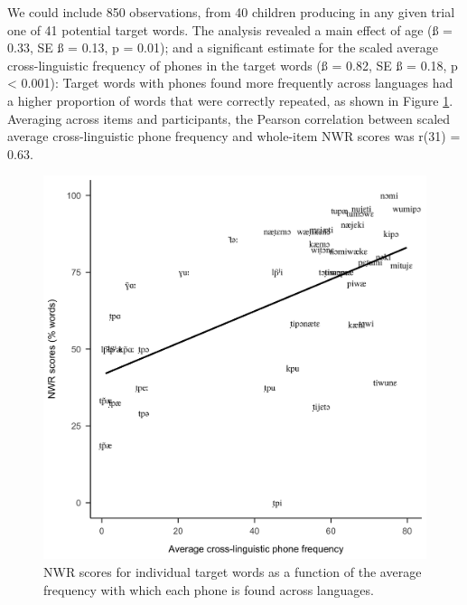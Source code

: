 \documentclass[english,,man,floatsintext]{apa6}
\begin{document}
We could include 850 observations, from 40 children producing in any
given trial one of 41 potential target words. The analysis revealed a
main effect of age (ß = 0.33, SE ß = 0.13, p = 0.01); and a significant
estimate for the scaled average cross-linguistic frequency of phones in
the target words (ß = 0.82, SE ß = 0.18, p \textless{} 0.001): Target
words with phones found more frequently across languages had a higher
proportion of words that were correctly repeated, as shown in Figure
\ref{fig:Fig2-xling-freq}. Averaging across items and participants, the
Pearson correlation between scaled average cross-linguistic phone
frequency and whole-item NWR scores was r(31) = 0.63.

\begin{figure}[!t]

{\centering \includegraphics[width=0.65\linewidth]{nwr.by.freq.ITEM} 

}

\caption{NWR scores for individual target words as a function of the average frequency with which each phone is found across languages.}\label{fig:Fig2-xling-freq}
\end{figure}
\end{document}
